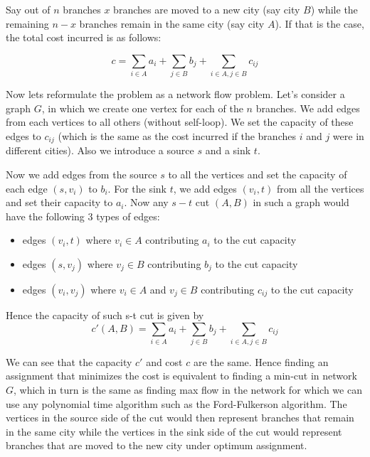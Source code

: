 Say out of $n$ branches $x$ branches are moved to a new city (say city $B$) while the remaining $n-x$ branches remain in the same city (say city $A$). If that is the case, the total cost incurred is as follows:

\[
  c = \sum\limits_{i \in A} a_i + \sum\limits_{j \in B} b_j + \sum\limits_{i \in A, j \in B} c_{ij}
\]

Now lets reformulate the problem as a network flow problem. Let's consider a graph $G$, in which we create one vertex for each of the  $n$ branches. We add edges from each vertices to all others (without self-loop). We set the capacity of these edges to $c_{ij}$ (which is the same as the cost incurred if the branches $i$ and $j$ were in different cities). Also we introduce a source $s$ and a sink $t$.

Now we add edges from the source $s$ to all the vertices and set the capacity of each edge $(s, v_i)$ to $b_i$. For the sink $t$, we add edges $(v_i, t)$ from all the vertices and set their capacity to $a_i$. Now any $s-t$ cut $(A, B)$ in such a graph would have the following 3 types of edges:

\begin{itemize}
\item edges $(v_i, t)$ where $v_i \in A$ contributing $a_i$ to the cut capacity
\item edges $(s, v_j)$ where $v_j \in B$ contributing $b_j$ to the cut capacity
\item edges $(v_i, v_j)$ where $v_i \in A$ and $v_j \in B$ contributing $c_{ij}$ to the cut capacity 
\end{itemize}

Hence the capacity of such s-t cut is given by \\

\[
  c'(A, B) = \sum\limits_{i \in A} a_i + \sum\limits_{j \in B} b_j + \sum\limits_{i \in A, j \in B} c_{ij}
\]



We can see that the capacity $c'$ and cost $c$ are the same. Hence finding an assignment that minimizes the cost is equivalent to finding a min-cut in network $G$, which in turn is the same as finding max flow in the network for which we can use any polynomial time algorithm such as the Ford-Fulkerson algorithm. The vertices in the source side of the cut would then represent branches that remain in the same city while the vertices in the sink side of the cut would represent branches that are moved to the new city under optimum assignment.

